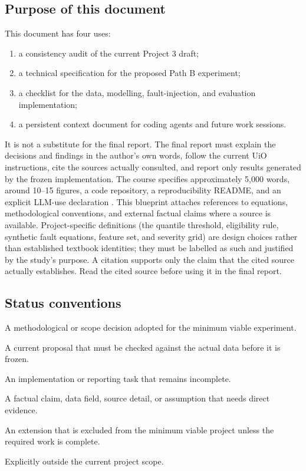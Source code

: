 \documentclass[11pt,a4paper]{article}
\begin{document}
\subsection{Purpose of this document}

This document has four uses:
\begin{enumerate}
  \item a consistency audit of the current Project 3 draft;
  \item a technical specification for the proposed Path B experiment;
  \item a checklist for the data, modelling, fault-injection, and evaluation implementation;
  \item a persistent context document for coding agents and future work sessions.
\end{enumerate}

It is not a substitute for the final report. The final report must explain the decisions and findings in the author's own words, follow the current UiO instructions, cite the sources actually consulted, and report only results generated by the frozen implementation. The course specifies approximately 5,000 words, around 10--15 figures, a code repository, a reproducibility README, and an explicit LLM-use declaration \cite{UiOProject3}.
This blueprint attaches references to equations, methodological conventions, and external factual claims where a source is available. Project-specific definitions (the quantile threshold, eligibility rule, synthetic fault equations, feature set, and severity grid) are design choices rather than established textbook identities; they must be labelled as such and justified by the study's purpose. A citation supports only the claim that the cited source actually establishes. Read the cited source before using it in the final report.

\subsection{Status conventions}

\begin{description}[leftmargin=2.1cm,style=nextline]
  \item[FIXED] A methodological or scope decision adopted for the minimum viable experiment.
  \item[PROVISIONAL] A current proposal that must be checked against the actual data before it is frozen.
  \item[TODO] An implementation or reporting task that remains incomplete.
  \item[VERIFY] A factual claim, data field, source detail, or assumption that needs direct evidence.
  \item[OPTIONAL] An extension that is excluded from the minimum viable project unless the required work is complete.
  \item[EXCLUDED] Explicitly outside the current project scope.
\end{description}
\end{document}
